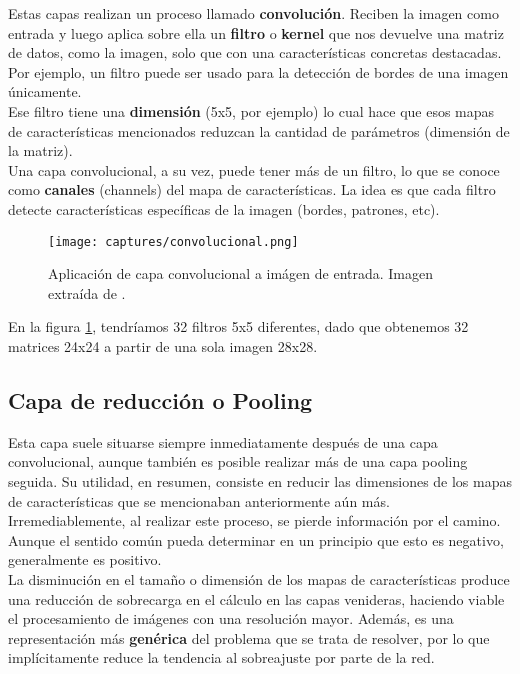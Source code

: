 \documentclass[11pt,fleqn]{book} %
\begin{document}
Estas capas realizan un proceso llamado \textbf{convolución}. Reciben la imagen como entrada y luego aplica sobre ella un \textbf{filtro} o \textbf{kernel} que nos devuelve una matriz de datos, como la imagen, solo que con una características concretas destacadas. Por ejemplo, un filtro puede ser usado para la detección de bordes de una imagen únicamente. \\

Ese filtro tiene una \textbf{dimensión} (5x5, por ejemplo) lo cual hace que esos mapas de características mencionados reduzcan la cantidad de parámetros (dimensión de la matriz).\\

Una capa convolucional, a su vez, puede tener más de un filtro, lo que se conoce como \textbf{canales} (channels) del mapa de características. La idea es que cada filtro detecte características específicas de la imagen (bordes, patrones, etc).

\begin{figure}[H]
	\centering\texttt{[image: captures/convolucional.png]}
	\caption{Aplicación de capa convolucional a imágen de entrada. Imagen extraída de \cite{article:convimagen1}.}
	\label{fig:convolucional} %
\end{figure}

En la figura \ref{fig:convolucional}, tendríamos 32 filtros 5x5 diferentes, dado que obtenemos 32 matrices 24x24 a partir de una sola imagen 28x28.

\subsection{Capa de reducción o Pooling}\label{sec:pooling}

Esta capa suele situarse siempre inmediatamente después de una capa convolucional, aunque también es posible realizar más de una capa pooling seguida. Su utilidad, en resumen, consiste en reducir las dimensiones de los mapas de características que se mencionaban anteriormente aún más. Irremediablemente, al realizar este proceso, se pierde información por el camino. Aunque el sentido común pueda determinar en un principio que esto es negativo, generalmente es positivo. \\

La disminución en el tamaño o dimensión de los mapas de características produce una reducción de sobrecarga en el cálculo en las capas venideras, haciendo viable el procesamiento de imágenes con una resolución mayor. Además, es una representación más \textbf{genérica} del problema que se trata de resolver, por lo que implícitamente reduce la tendencia al sobreajuste por parte de la red. \\
\end{document}
